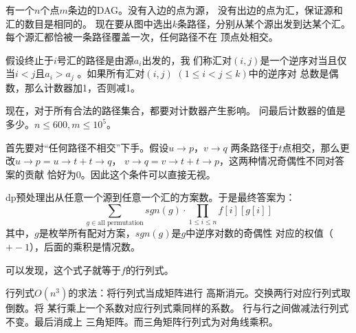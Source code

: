 \begin{prob}
	有一个$n$个点$m$条边的DAG。没有入边的点为源，
	没有出边的点为汇，保证源和汇的数目是相同的。
	现在要从图中选出$k$条路径，分别从某个源出发到达某个汇。
	每个源汇都恰被一条路径覆盖一次，任何路径不在
	顶点处相交。\par
	假设终止于$i$号汇的路径是由源$a_i$出发的，我
	们称汇对$(i,j)$是一个逆序对当且仅当$i<j$且$a_i>a_j$
	。如果所有汇对$(i,j)$ $(1 \le i<j \le k)$中的逆序对
	总数是偶数，那么计数器加1，否则减1。\par
	现在，对于所有合法的路径集合，都要对计数器产生影响。
	问最后计数器的值是多少。$n \le 600, m \le 10^5$。
\end{prob}

\begin{sol}
	首先要对“任何路径不相交”下手。假设$u \to p$，$v \to q$
	两条路径于$t$点相交，那么更改$u \to p = u \to t + t \to q$，
	$v \to q = v \to t + t \to p$，这两种情况奇偶性不同对答案的贡献
	恰好为0。因此这个条件可以直接无视。
	\par 
	dp预处理出从任意一个源到任意一个汇的方案数。于是最终答案为：
	\begin{displaymath}
		\sum_{g \in \text{all permutation}} sgn(g) \cdot 
		\prod_{1 \le i \le n} f[i][g[i]]
	\end{displaymath}
	其中，$g$是枚举所有配对方案，$sgn(g)$是$g$中逆序对数的奇偶性
	对应的权值（$+-1$），后面的乘积是情况数。\par
	可以发现，这个式子就等于$f$的行列式。\par
	行列式$O(n^3)$的求法：将行列式当成矩阵进行
	高斯消元。交换两行对应行列式取倒数。将
	某行乘上一个系数对应行列式乘同样的系数。
	行与行之间做减法行列式不变。最后消成上
	三角矩阵。而三角矩阵行列式为对角线乘积。
\end{sol}

